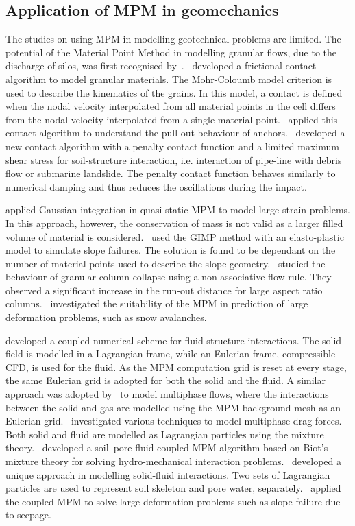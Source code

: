 \subsection{Application of MPM in geomechanics}

The studies on using MPM in modelling geotechnical problems are limited. The 
potential of the Material Point Method 
in modelling granular flows, due to the discharge of silos, was first 
recognised by~\citet{Wieckowski1999}.~\citet{Bardenhagen2001} developed a 
frictional contact algorithm to model granular materials. The Mohr-Coloumb 
model criterion is used to describe the kinematics of the grains. In this 
model, a contact is defined when the nodal velocity interpolated from all 
material points in the cell differs from the nodal velocity interpolated from a 
single material point.~\citet{Coetzee2005} applied this contact algorithm to 
understand the pull-out behaviour of anchors.~\citet{Ma2014} developed a new 
contact algorithm with a penalty contact function and a limited maximum shear 
stress for soil-structure interaction, i.e. interaction of pipe-line with 
debris flow or submarine landslide. The penalty contact function behaves 
similarly to numerical damping and thus reduces the oscillations during the 
impact. 

\citet{Beuth2010} applied Gaussian integration in quasi-static MPM to model 
large strain problems. In this approach, however, the conservation of mass is 
not valid as a larger filled volume of material is 
considered.~\citet{Andersen2010} used the GIMP method with an elasto-plastic 
model to simulate slope failures. The solution is found to be dependant on the 
number of material points used to 
describe the slope geometry.~\citet{Mast2014} studied the behaviour of granular 
column collapse using a non-associative flow rule. They observed a 
significant increase in the run-out distance for large aspect ratio 
columns.~\citet{Mast2014a} investigated the suitability of the MPM in 
prediction of large deformation problems, such as snow avalanches. 

\citet{Guilkey2007} developed a coupled numerical scheme for fluid-structure 
interactions. The solid field is modelled in a Lagrangian frame, while an 
Eulerian frame, compressible CFD, is used for the fluid. As the MPM computation 
grid is reset at every stage, the same Eulerian grid is adopted for both the 
solid and the fluid. A similar approach was adopted by~\cite{Zhang2008} to 
model multiphase flows, where the interactions between the solid and gas are 
modelled using the MPM background mesh as an Eulerian 
grid.~\citet{Mackenzie-Helnwein2010} investigated various techniques to model 
multiphase drag forces. Both solid and fluid are modelled as Lagrangian 
particles using the mixture theory.~\citet{Abe2013} developed a soil–pore fluid 
coupled MPM algorithm based on Biot’s mixture theory for solving 
hydro-mechanical interaction problems.~\citet{Bandara2013} developed a unique 
approach in modelling solid-fluid interactions. Two sets of Lagrangian 
particles are used to represent soil skeleton and pore water, 
separately.~\citet{Bandara2013} applied the coupled MPM to solve large 
deformation problems such as slope failure due to seepage.

